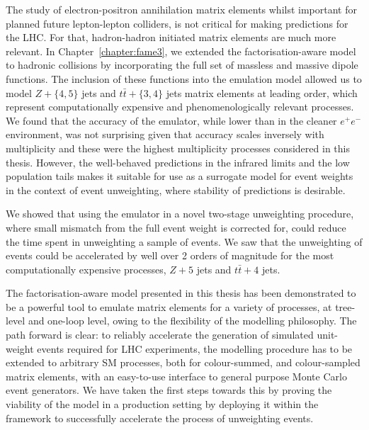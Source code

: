 \documentclass[main.tex]{subfiles}
\begin{document}
The study of electron-positron annihilation matrix elements
whilst important for planned future lepton-lepton colliders,
is not critical for making predictions for the LHC. For that,
hadron-hadron initiated matrix elements are much more relevant.
In Chapter~\ref{chapter:fame3}, we extended the factorisation-aware
model to hadronic collisions by incorporating the full set
of massless and massive dipole functions. The inclusion of these
functions into the emulation model allowed us to model $Z+\{4,5\}$ jets
and $t\bar{t}+\{3,4\}$ jets matrix elements at leading order, which
represent computationally expensive and phenomenologically relevant
processes. We found
that the accuracy of the emulator, while lower than in the cleaner
$e^{+}e^{-}$ environment, was not surprising given that accuracy
scales inversely with multiplicity and these were the highest
multiplicity processes considered in this thesis.
However, the well-behaved
predictions in the infrared limits and the low population tails
makes it suitable for use as a surrogate model for event
weights in the context of event unweighting, where stability
of predictions is desirable.

We showed that using the emulator in a novel two-stage
unweighting procedure, where small mismatch from the full event
weight is corrected for, could reduce the time spent in unweighting
a sample of events. We saw that the unweighting of events
could be accelerated by well over 2 orders of
magnitude for the most computationally expensive processes,
$Z+5$ jets and $t\bar{t}+4$ jets.

The factorisation-aware model presented in this thesis
has been demonstrated to be a powerful tool to emulate
matrix elements for a variety of processes, at
tree-level and one-loop level, owing to the
flexibility of the modelling philosophy.
The path forward is clear: to reliably accelerate the generation of
simulated unit-weight events required for LHC experiments, the
modelling procedure has to be extended to arbitrary SM
processes, both for colour-summed, and colour-sampled matrix
elements, with an easy-to-use interface to general
purpose Monte Carlo event generators.
We have taken the first steps towards this by proving the viability
of the model in a production setting by deploying it
within the {\Sherpa} framework to successfully accelerate the
process of unweighting events.
\end{document}
